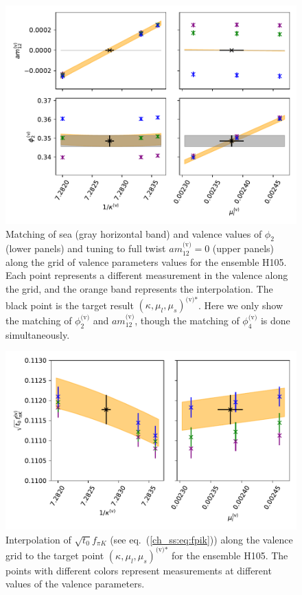 \begin{figure}
    \centering
    \includegraphics[width=1.\textwidth]{./cap4/figs/matching_N200.pdf}
    \caption{Matching of sea (gray horizontal band) and valence values of $\phi_2$ (lower panels) and tuning to full twist $am_{12}^{\textrm{(v)}}=0$ (upper panels) along the grid of valence parameters values for the ensemble H105. Each point represents a different measurement in the valence along the grid, and the orange band represents the interpolation. The black point is the target result $\left(\kappa,\mu_l,\mu_s\right)^{\textrm{(v)*}}$. Here we only show the matching of $\phi_2^{\textrm{(v)}}$ and $am_{12}^{\textrm{(v)}}$, though the matching of $\phi_4^{\textrm{(v)}}$ is done simultaneously.}
    \label{ch_ma:fig:match}
\end{figure}

\begin{figure}
    \centering
    \includegraphics[width=1.\textwidth]{./cap4/figs/interp_fpik_N200.pdf}
    \caption{Interpolation of $\sqrt{t_0}f_{\pi K}$ (see eq.~(\ref{ch_ss:eq:fpik})) along the valence grid to the target point $\left(\kappa,\mu_l,\mu_s\right)^{\textrm{(v)*}}$ for the ensemble H105. The points with different colors represent measurements at different values of the valence parameters.}
    \label{ch_ma:fig:fpik_interp}
\end{figure}

